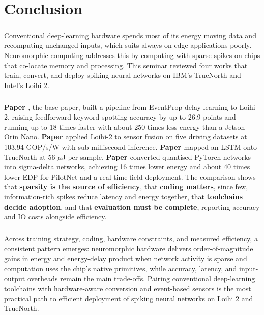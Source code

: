 \documentclass[12pt,a4paper,final]{extreport}
\begin{document}
\chapter{Conclusion}

\paragraph{} Conventional deep-learning hardware spends most of its energy moving data and recomputing unchanged inputs, which suits always-on edge applications poorly. Neuromorphic computing addresses this by computing with sparse spikes on chips that co-locate memory and processing. This seminar reviewed four works that train, convert, and deploy spiking neural networks on IBM's TrueNorth and Intel's Loihi 2.

\paragraph{} \textbf{Paper \cite{p1}}, the base paper, built a pipeline from EventProp delay learning to Loihi 2, raising feedforward keyword-spotting accuracy by up to 26.9 points and running up to 18 times faster with about 250 times less energy than a Jetson Orin Nano. \textbf{Paper \cite{p2}} applied Loihi-2 to sensor fusion on five driving datasets at 103.94 GOP/s/W with sub-millisecond inference. \textbf{Paper \cite{p3}} mapped an LSTM onto TrueNorth at 56 $\mu$J per sample. \textbf{Paper \cite{p4}} converted quantised PyTorch networks into sigma-delta networks, achieving 16 times lower energy and about 40 times lower EDP for PilotNet and a real-time field deployment. The comparison shows that \textbf{sparsity is the source of efficiency}, that \textbf{coding matters}, since few, information-rich spikes reduce latency and energy together, that \textbf{toolchains decide adoption}, and that \textbf{evaluation must be complete}, reporting accuracy and IO costs alongside efficiency.

\paragraph{} Across training strategy, coding, hardware constraints, and measured efficiency, a consistent pattern emerges: neuromorphic hardware delivers order-of-magnitude gains in energy and energy-delay product when network activity is sparse and computation uses the chip's native primitives, while accuracy, latency, and input-output overheads remain the main trade-offs. Pairing conventional deep-learning toolchains with hardware-aware conversion and event-based sensors is the most practical path to efficient deployment of spiking neural networks on Loihi 2 and TrueNorth.
\end{document}
